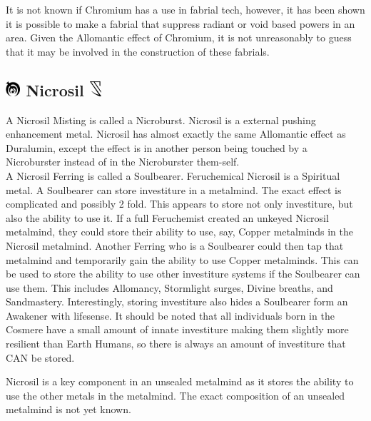 \documentclass[conference]{IEEEtran}
\begin{document}
It is not known if Chromium has a use in fabrial tech, however, it has been shown it is possible to make a fabrial that suppress radiant or void based powers in an area.  Given the Allomantic effect of Chromium, it is not unreasonably to guess that it may be involved in the construction of these fabrials.
\subsection*{\includegraphics[height=1em]{images/Nicrosil.png}  Nicrosil \includegraphics[height=1em]{images/Nicrosil_(Feruchemy).png}}
A Nicrosil Misting is called a Nicroburst.  Nicrosil is a external pushing enhancement metal.  Nicrosil has almost exactly the same Allomantic effect as Duralumin, except the effect is in another person being touched by a Nicroburster instead of in the Nicroburster them-self.\\

A Nicrosil Ferring is called a Soulbearer.  Feruchemical Nicrosil is a Spiritual metal.  A Soulbearer can store investiture in a metalmind.  The exact effect is complicated and possibly 2 fold.  This appears to store not only investiture, but also the ability to use it.  If a full Feruchemist created an unkeyed Nicrosil metalmind, they could store their ability to use, say, Copper metalminds in the Nicrosil metalmind.  Another Ferring who is a Soulbearer could then tap that metalmind and temporarily gain the ability to use Copper metalminds.  This can be used to store the ability to use other investiture systems if the Soulbearer can use them.  This includes Allomancy, Stormlight surges, Divine breaths, and Sandmastery.  
Interestingly, storing investiture also hides a Soulbearer form an Awakener with lifesense.  It should be noted that all individuals born in the Cosmere have a small amount of innate investiture making them slightly more resilient than Earth Humans, so there is always an amount of investiture that CAN be stored.

Nicrosil is a key component in an unsealed metalmind as it stores the ability to use the other metals in the metalmind.  The exact composition of an unsealed metalmind is not yet known.\\
\end{document}
